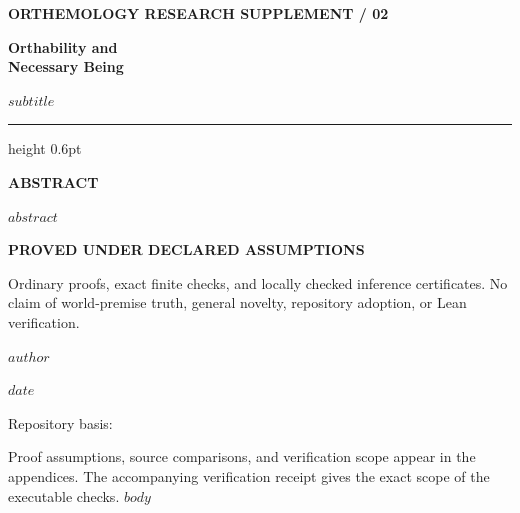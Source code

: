 \documentclass[11pt,a4paper]{article}
\begin{document}
\begin{titlepage}
\thispagestyle{empty}
\vspace*{5mm}
{\sffamily\small\bfseries\color{ink} ORTHEMOLOGY \hfill RESEARCH SUPPLEMENT / 02\par}
\vspace{15mm}
{\sffamily\fontsize{30}{35}\selectfont\bfseries\color{ink} Orthability and\\[2pt]Necessary Being\par}
\vspace{6mm}
{\sffamily\large\color{softink} $subtitle$\par}
\vspace{10mm}
{\color{hairline}\hrule height 0.6pt}
\vspace{8mm}
{\sffamily\small\bfseries\color{ink} ABSTRACT\par}
\vspace{2mm}
$abstract$
\vfill
{\sffamily\small\bfseries\color{ink} PROVED UNDER DECLARED ASSUMPTIONS\par}
{\small Ordinary proofs, exact finite checks, and locally checked inference certificates. No claim of world-premise truth, general novelty, repository adoption, or Lean verification.\par}
\vspace{6mm}
{\sffamily\small $author$\par}
{\sffamily\small\color{softink} $date$\par}
\vspace{4mm}
{\footnotesize Repository basis: \par}
\end{titlepage}
\begingroup
\setlength{\parskip}{0pt}
\tableofcontents
\endgroup
\vspace{6mm}
{\small\color{softink} Proof assumptions, source comparisons, and verification scope appear in the appendices. The accompanying verification receipt gives the exact scope of the executable checks.}
\clearpage
{}
$body$
\end{document}
